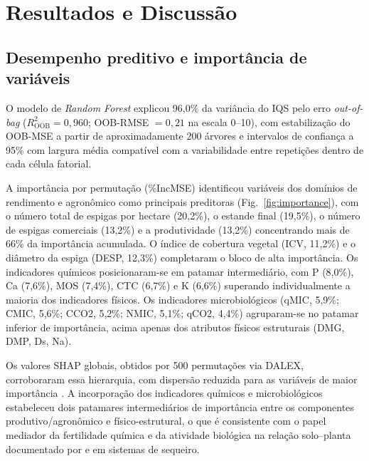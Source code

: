 \documentclass[pdflatex,sn-basic]{sn-jnl}%
\begin{document}
\section{Resultados e Discussão}\label{sec:results_discussion}

\subsection{Desempenho preditivo e importância de variáveis}\label{subsec:performance}

O modelo de \textit{Random Forest} explicou 96,0\% da variância do IQS pelo erro \textit{out-of-bag} ($R^2_{\text{OOB}} = 0{,}960$; OOB-RMSE $= 0{,}21$ na escala 0--10), com estabilização do OOB-MSE a partir de aproximadamente 200 árvores e intervalos de confiança a 95\% com largura média compatível com a variabilidade entre repetições dentro de cada célula fatorial.

A importância por permutação (\%IncMSE) identificou variáveis dos domínios de rendimento e agronômico como principais preditoras (Fig.~\ref{fig:importance}), com o número total de espigas por hectare (20,2\%), o estande final (19,5\%), o número de espigas comerciais (13,2\%) e a produtividade (13,2\%) concentrando mais de 66\% da importância acumulada. O índice de cobertura vegetal (ICV, 11,2\%) e o diâmetro da espiga (DESP, 12,3\%) completaram o bloco de alta importância. Os indicadores químicos posicionaram-se em patamar intermediário, com P (8,0\%), Ca (7,6\%), MOS (7,4\%), CTC (6,7\%) e K (6,6\%) superando individualmente a maioria dos indicadores físicos. Os indicadores microbiológicos (qMIC, 5,9\%; CMIC, 5,6\%; CCO2, 5,2\%; NMIC, 5,1\%; qCO2, 4,4\%) agruparam-se no patamar inferior de importância, acima apenas dos atributos físicos estruturais (DMG, DMP, Ds, Na). 

Os valores SHAP globais, obtidos por 500 permutações via DALEX, corroboraram essa hierarquia, com dispersão reduzida para as variáveis de maior importância \citep{Lundberg2017,Shahriari2023}. A incorporação dos indicadores químicos e microbiológicos estabeleceu dois patamares intermediários de importância entre os componentes produtivo/agronômico e físico-estrutural, o que é consistente com o papel mediador da fertilidade química e da atividade biológica na relação solo--planta documentado por \cite{Nabiollahi2020} e \cite{Cardoso2013} em sistemas de sequeiro.
\end{document}
